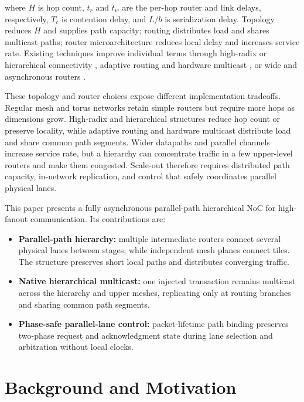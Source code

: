 \documentclass[conference]{IEEEtran}
\begin{document}
where \(H\) is hop count, \(t_r\) and \(t_w\) are the per-hop router and link
delays, respectively, \(T_c\) is contention delay, and \(L/b\) is serialization delay.
Topology reduces \(H\) and supplies path capacity; routing distributes
load and shares multicast paths; router microarchitecture reduces local
delay and increases service rate. Existing techniques improve individual
terms through high-radix or hierarchical connectivity
\cite{kim2007flattened,zhong2025paicore}, adaptive routing and hardware
multicast \cite{xiang2017carpool,jerger2008vctm}, or wide and asynchronous
routers \cite{fischer2025floonoc,liu2026monet,zhang2026reusable}.

These topology and router choices expose different implementation tradeoffs.
Regular mesh and torus networks retain simple routers but require more hops as dimensions
grow. High-radix and hierarchical structures reduce hop count or preserve
locality, while adaptive routing and hardware multicast distribute load and
share common path segments. Wider datapaths and parallel channels increase
service rate, but a hierarchy can concentrate traffic in a few upper-level
routers and make them congested. Scale-out therefore requires distributed path
capacity, in-network replication, and control that safely coordinates parallel
physical lanes.

This paper presents a fully asynchronous parallel-path hierarchical NoC
for high-fanout communication. Its contributions are:

\begin{itemize}
\item \textbf{Parallel-path hierarchy:} multiple intermediate routers
connect several physical lanes between stages, while independent mesh
planes connect tiles. The structure preserves short local paths and
distributes converging traffic.
\item \textbf{Native hierarchical multicast:} one injected transaction
remains multicast across the hierarchy and upper meshes, replicating only
at routing branches and sharing common path segments.
\item \textbf{Phase-safe parallel-lane control:} packet-lifetime path
binding preserves two-phase request and acknowledgment state during lane
selection and arbitration without local clocks.
\end{itemize}

\section{Background and Motivation}\label{sec:background}
\end{document}
